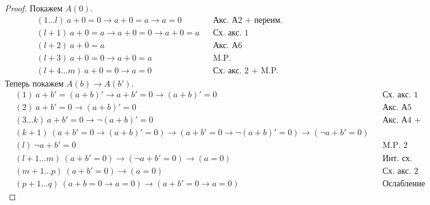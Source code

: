 \documentclass[a4paper,11pt]{article}
\theoremstyle{definition}
\begin{document}
\begin{proof}
Покажем $A(0)$.
\begin{align*}
&(1\dots l)\ a + 0 = 0 \to a + 0 = a \to a = 0 &&\text{Акс. А2 + переим.}\\
&(l+1)\ a + 0 = a \to a + 0 = 0 \to a + 0 = a &&\text{Сх. акс. 1}\\
&(l+2)\ a + 0 = a &&\text{Акс. А6}\\
&(l+3)\ a + 0 = 0 \to a + 0 = a &&\text{M.P.}\\
&(l+4\dots m)\ a + 0 = 0 \to a = 0 &&\text{Сх. акс. 2 + M.P.}
\end{align*}
Теперь покажем $A(b) \to A(b')$.
\begin{align*}
&(1)\ a + b' = (a + b)' \to a + b' = 0 \to (a + b)' = 0 &&\text{Сх. акс. 1}\\
&(2)\ a + b' = 0 \to (a + b)' = 0 &&\text{Акс. А5}\\
&(3\dots k)\ a + b' = 0 \to \neg(a + b)' = 0 &&\text{Акс. А4 + замена пер. + ослабление}\\
&(k+1)\ (a + b' = 0 \to (a + b)' = 0) \to (a + b' = 0 \to \neg(a + b)' = 0) \to (\neg a + b' = 0) &&\\
&(l)\ \neg a + b' = 0 &&\text{M.P. 2 раза}\\
&(l+1\dots m)\ (a + b' = 0) \to (\neg a + b' = 0) \to (a = 0) &&\text{Инт. сх. акс. 10}\\
&(m+1\dots p)\ (a + b' = 0) \to (a = 0) &&\text{Сх. акс. 2 + M.P. 2 раза}\\
&(p+1\dots q)\ (a + b = 0 \to a = 0) \to (a + b' = 0 \to a = 0) &&\text{Ослабление}
\end{align*}
\end{proof}
\end{document}

